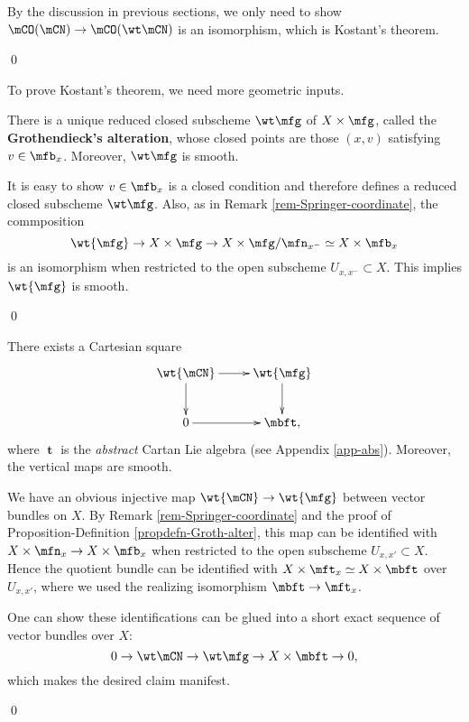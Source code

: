 	\proof
		By the discussion in previous sections, we only need to show $\mCO(\mCN) \to \mCO(\wt\mCN)$ is an isomorphism, which is Kostant's theorem.

	\qed

	To prove Kostant's theorem, we need more geometric inputs.

	\begin{propdefn}
		\label{propdefn-Groth-alter}
		There is a unique reduced closed subscheme $\wt\mfg$ of $X\mt \mfg$, called the \textbf{Grothendieck's alteration}, whose closed points are those $(x,v)$ satisfying $v\in \mfb_x$. Moreover, $\wt\mfg$ is smooth.
	\end{propdefn}

	\proof[Sketch]
		It is easy to show $v\in \mfb_x$ is a closed condition and therefore defines a reduced closed subscheme $\wt\mfg$. Also, as in Remark \ref{rem-Springer-coordinate}, the commposition 
		\[
			\wt{\mfg} \to X\mt \mfg \to X \mt \mfg/\mfn_{x^-} \simeq X \mt \mfb_x
		\] 
		is an isomorphism when restricted to the open subscheme $U_{x,x^-}\subset X$. This implies $\wt{\mfg}$ is smooth.

	\qed



	\begin{lem}
		\label{lem-Groth-alter-Cartan}
		There exists a Cartesian square
		\[
			\xymatrix{
				\wt{\mCN} \ar[r] \ar[d] & \wt{\mfg} \ar[d] \\
				0 \ar[r] & \mbft,
			}
		\]
		where $\mbft$ is the \emph{abstract} Cartan Lie algebra (see Appendix \ref{app-abs}). Moreover, the vertical maps are smooth.

	\end{lem}

	\proof[Sketch]
		We have an obvious injective map $\wt{\mCN} \to \wt{\mfg}$ between vector bundles on $X$. By Remark \ref{rem-Springer-coordinate} and the proof of Proposition-Definition \ref{propdefn-Groth-alter}, this map can be identified with $X\mt \mfn_x \to X\mt \mfb_x $ when restricted to the open subscheme $U_{x,x'} \subset X$. Hence the quotient bundle can be identified with $X \mt \mft_x \simeq X\mt \mbft$ over $U_{x,x'}$, where we used the realizing isomorphism $\mbft \to \mft_x$.

		One can show these identifications can be glued into a short exact sequence of vector bundles over $X$:
		\[
			0 \to \wt\mCN \to \wt\mfg \to X \mt \mbft \to 0,
		\]
		which makes the desired claim manifest.

	\qed

